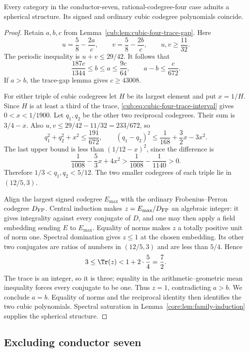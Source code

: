 \begin{theorem}\label{cub:thm:cubic-four-spherical}
Every category in the conductor-seven, rational-codegree-four case
admits a spherical structure. Its signed and ordinary cubic codegree
polynomials coincide.
\end{theorem}
\begin{proof}
Retain $a,b,c$ from Lemma~\ref{cub:lem:cubic-four-trace-gap}. Here
\[
 u=\frac58-\frac{2a}{c},\qquad
 v=\frac58-\frac{2b}{c},\qquad
 u,v\ge\frac{11}{32}.
\]
The periodic inequality is $u+v\le29/42$. It follows that
\begin{equation}\label{cub:eq:cubic-four-trace-interval}
 \frac{187c}{1344}\le b\le a\le\frac{9c}{64},
 \qquad a-b\le\frac{c}{672}.
\end{equation}
If $a>b$, the trace-gap lemma gives $c\ge43008$.

For either triple of cubic codegrees let $H$ be its largest element
and put $x=1/H$. Since $H$ is at least a third of the trace,
\eqref{cub:eq:cubic-four-trace-interval} gives $0<x<1/1900$.
Let $q_1,q_2$ be the other two reciprocal codegrees. Their sum is
$3/4-x$. Also $u,v\le29/42-11/32=233/672$, so
\[
 q_1^2+q_2^2+x^2\le\frac{191}{672},\qquad
 (q_1-q_2)^2\le\frac1{168}+\frac32x-3x^2.
\]
The last upper bound is less than $(1/12-x)^2$, since the difference is
\[
 \frac1{1008}-\frac53x+4x^2
 >\frac1{1008}-\frac1{1140}>0.
\]
Therefore $1/3<q_1,q_2<5/12$. The two smaller codegrees of each
triple lie in $(12/5,3)$.

Align the largest signed codegree $E_{\max}$ with the ordinary
Frobenius--Perron codegree $D_{\rm FP}$. Central induction makes
$z=E_{\max}/D_{\rm FP}$ an algebraic integer: it gives integrality
against every conjugate of $D$, and one may then apply a field
embedding sending $E$ to $E_{\max}$. Equality of norms makes $z$
a totally positive unit of norm one. Spectral domination gives
$z\le1$ at the chosen embedding. Its other two conjugates are ratios
of numbers in $(12/5,3)$ and are less than $5/4$. Hence
\[
 3\le\Tr(z)<1+2\cdot\frac54=\frac72.
\]
The trace is an integer, so it is three; equality in the
arithmetic--geometric mean inequality forces every conjugate to be
one. Thus $z=1$, contradicting $a>b$.
We conclude $a=b$. Equality of norms and the reciprocal identity
then identifies the two cubic polynomials. Spectral saturation in
Lemma~\ref{core:lem:family-induction} supplies the spherical structure.
\end{proof}

\subsection{Excluding conductor seven}

